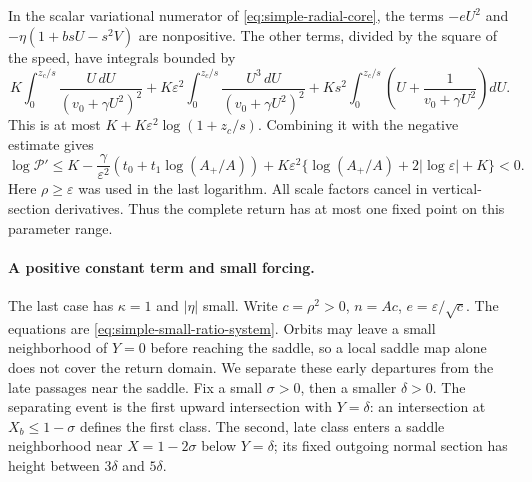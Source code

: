 In the scalar variational numerator of \eqref{eq:simple-radial-core},
the terms $-eU^2$ and $-\eta(1+bsU-s^2V)$ are nonpositive.
The other terms, divided by the square of the speed, have integrals
bounded by
\[
 K\int_0^{z_c/s}\frac{U\,dU}{(v_0+\gamma U^2)^2}
 +K\varepsilon^2\int_0^{z_c/s}
                         \frac{U^3\,dU}{(v_0+\gamma U^2)^2}
 +Ks^2\int_0^{z_c/s}\left(U+\frac1{v_0+\gamma U^2}\right)dU.
\]
This is at most $K+K\varepsilon^2\log(1+z_c/s)$.
Combining it with the negative estimate gives
\[
 \log\mathcal P'
 \le K-\frac{\gamma}{\varepsilon^2}
             (t_0+t_1\log(A_+/A))
       +K\varepsilon^2\{\log(A_+/A)+2|\log\varepsilon|+K\}<0.
\]
Here $\rho\ge\varepsilon$ was used in the last logarithm.
All scale factors cancel in vertical-section derivatives.
Thus the complete return has at most one fixed point on this
parameter range.

\paragraph{A positive constant term and small forcing.}
The last case has $\kappa=1$ and $|\eta|$ small.
Write $c=\rho^2>0$, $n=Ac$, $e=\varepsilon/\sqrt c$.
The equations are \eqref{eq:simple-small-ratio-system}.
Orbits may leave a small neighborhood of $Y=0$ before reaching the
saddle, so a local saddle map alone does not cover the return domain.
We separate these early departures from the late passages near the saddle.
Fix a small $\sigma>0$, then a smaller $\delta>0$.
The separating event is the first upward intersection with $Y=\delta$:
an intersection at $X_b\le1-\sigma$ defines the first class.
The second, late class enters a saddle neighborhood near $X=1-2\sigma$
below $Y=\delta$; its fixed outgoing normal section has height between
$3\delta$ and $5\delta$.

